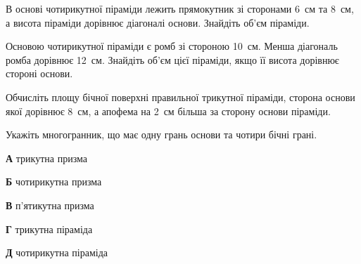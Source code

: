 \documentclass[12pt]{article}
\begin{document}
\begin{samepage}
\noindent\zadnum В основі чотирикутної піраміди лежить прямокутник зі сторонами 6~см та 8~см, а висота піраміди дорівнює діагоналі основи. Знайдіть об’єм піраміди. 

\nmtnobreak
\nopagebreak\nbvspace{0.3cm}
\par{}
\end{samepage}

\begin{samepage}
\noindent\zadnum Основою чотирикутної піраміди є ромб зі стороною 10~см. Менша діагональ ромба дорівнює 12~см. Знайдіть об’єм цієї піраміди, якщо її висота дорівнює стороні основи. 

\nmtnobreak
\nopagebreak\nbvspace{0.3cm}
\par{}
\end{samepage}

\begin{samepage}
\noindent\zadnum Обчисліть площу бічної поверхні правильної трикутної піраміди, сторона основи якої дорівнює 8~см, а апофема на 2~см більша за сторону основи піраміди. 

\nmtnobreak
\nopagebreak\nbvspace{0.3cm}
\par{}
\end{samepage}

\begin{samepage}
\noindent\zadnum Укажіть многогранник, що має одну грань основи та чотири бічні грані. 

\nmtnobreak
\nopagebreak\nbvspace{0.3cm}
\noindent
\textbf{А} \quad трикутна призма

\nmtnobreak
\noindent
\textbf{Б} \quad чотирикутна призма

\nmtnobreak
\noindent
\textbf{В} \quad п’ятикутна призма

\nmtnobreak
\noindent
\textbf{Г} \quad трикутна піраміда

\nmtnobreak
\noindent
\textbf{Д} \quad чотирикутна піраміда

\nmtnobreak
\nopagebreak\nbvspace{0.5cm}
\par{}\vspace{0.25cm}
\end{samepage}
\end{document}

